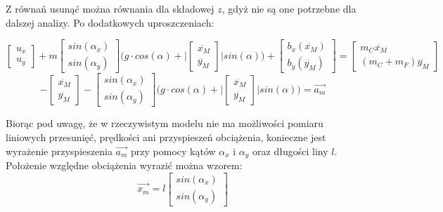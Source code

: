 \documentclass[10pt]{article}
\begin{document}
Z równań usunąć można równania dla składowej $z$, gdyż nie są one potrzebne dla dalszej analizy. Po dodatkowych uproszczeniach:

\begin{equation}
\begin{bmatrix} u_x \\ u_y \end{bmatrix} + 
m \begin{bmatrix} sin(\alpha_x) \\ sin(\alpha_y) \end{bmatrix}
\Bigg( g \cdot cos(\alpha) + \Bigg| \begin{bmatrix} \ddot{x_M} \\ \ddot{y_M} \end{bmatrix} \Bigg| sin(\alpha) \Bigg) + 
\begin{bmatrix} b_x(\dot{x_M}) \\ b_y(\dot{y_M}) \end{bmatrix} = 
\begin{bmatrix} m_C \ddot{x_M} \\ (m_C + m_F) \ddot{y_M} \end{bmatrix}
\end{equation}
\begin{equation}
 - \begin{bmatrix} \ddot{x_M} \\ \ddot{y_M} \end{bmatrix} - 
\begin{bmatrix} sin(\alpha_x) \\ sin(\alpha_y) \end{bmatrix}
\Bigg( g \cdot cos(\alpha) + \Bigg| \begin{bmatrix} \ddot{x_M} \\ \ddot{y_M} \end{bmatrix} \Bigg| sin(\alpha) \Bigg)
 = \vec{a_m}
\end{equation}

Biorąc pod uwagę, że w rzeczywistym modelu nie ma możliwości pomiaru liniowych przesunięć, prędkości ani przyspieszeń obciążenia, konieczne jest wyrażenie przyspieszenia $\vec{a_m}$ przy pomocy kątów $\alpha_x$ i $\alpha_y$ oraz długości liny $l$. Położenie względne obciążenia wyrazić można wzorem:
\begin{equation}
\vec{x_m} = l \begin{bmatrix} sin(\alpha_x) \\ sin(\alpha_y) \end{bmatrix}
\end{equation}
\end{document}
